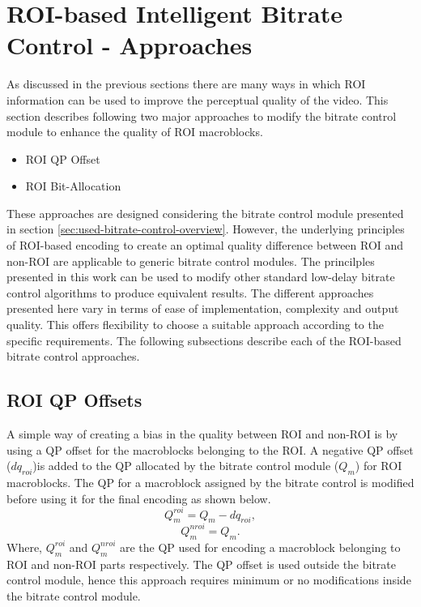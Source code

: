 \documentclass[11pt]{article} %
\begin{document}
\section{ROI-based Intelligent Bitrate Control - Approaches}
As discussed in the previous sections there are many ways in which ROI information can be used to improve the perceptual quality of the video. This section describes following two major approaches to modify the bitrate control module to enhance the quality of ROI macroblocks. 
\begin{itemize}
	\item ROI QP Offset
	\item ROI Bit-Allocation
\end{itemize}
These approaches are designed considering the bitrate control module presented in section \ref{sec:used-bitrate-control-overview}. However, the underlying principles of ROI-based encoding to create an optimal quality difference between ROI and non-ROI are applicable to generic bitrate control modules. The princilples presented in this work can be used to modify other standard low-delay bitrate control algorithms to produce equivalent results. The different approaches presented here vary in terms of ease of implementation, complexity and output quality. This offers flexibility to choose a suitable approach according to the specific requirements. The following subsections describe each of the ROI-based bitrate control approaches.

\subsection{ROI QP Offsets}
A simple way of creating a bias in the quality between ROI and non-ROI is by using a QP offset for the macroblocks belonging to the ROI. A negative QP offset ($dq_{roi}$)is added to the QP allocated by the bitrate control module ($Q_m$) for ROI macroblocks. The QP for a macroblock assigned by the bitrate control is modified before using it for the final encoding as shown below.
$$Q_m^{roi} = Q_m - dq_{roi},$$
$$Q_m^{nroi} = Q_m.$$
Where, $Q_m^{roi}$ and $Q_m^{nroi}$ are the QP used for encoding a macroblock belonging to ROI and non-ROI parts respectively. The QP offset is used outside the bitrate control module, hence this approach requires minimum or no modifications inside the bitrate control module. 
\end{document}
